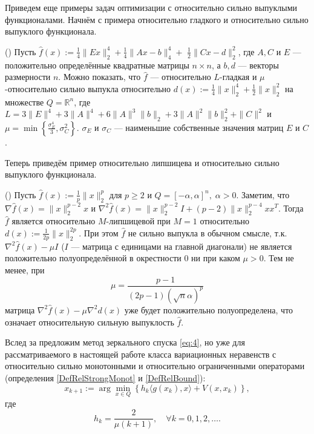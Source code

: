     Приведем еще примеры задач оптимизации с относительно сильно выпуклыми функционалами. Начнём с примера относительно гладкого и относительно сильно выпуклого функционала.

    \begin{example} (\cite{Lu_Nesterov_2018}) Пусть $\widehat{f}(x):=\frac{1}{4}\|E x\|_{2}^{4}+\frac{1}{4}\|A x-b\|_{4}^{4}+$ $\frac{1}{2}\|C x-d\|_{2}^{2}$, где $A, C$ и $E$ --- положительно определённые квадратные матрицы $n \times n$, а $b, d$ --- векторы размерности $n$. Можно показать, что $\widehat{f}$ --- относительно $L$-гладкая и $\mu$-относительно сильно выпукла относительно
        $
            d(x):=\frac{1}{4}\|x\|_{2}^{4}+\frac{1}{2}\|x\|_{2}^{2}
        $
        на множестве $Q=\mathbb{R}^{n}$, где $L=3\|E\|^{4}+3\|A\|^{4}+6\|A\|^{3}\|b\|_{2}+3\|A\|^{2}\|b\|_{2}^{2}+\|C\|^{2}$ и $\mu=\min \left\{\frac{\sigma_{E}^{4}}{3}, \sigma_{C}^{2}\right\}$. 
         $\sigma_{E}$ и $\sigma_{C}$ --- наименьшие собственные значения матриц $E$ и $C$.
    \end{example}

    Теперь приведём пример относительно липшицева и относительно сильно выпуклого функционала.

    \begin{example} (\cite{Zhou_NIPS_2020}) 
        Пусть $\widehat{f}(x) := \frac{1}{p} \|x\|_2^p$ для $p \geq 2$ и $ Q = [-\alpha, \alpha]^n, \; \alpha > 0$. Заметим, что $\nabla \widehat{f}(x) = \|x\|_2^{p - 2} x$ и $\nabla^2 \widehat{f}(x) = \|x\|_2^{p - 2} I + (p-2)\|x\|_2^{p - 4} x x^{T}$. Тогда $\widehat{f}$ является относительно $M$-липшицевой при $M = 1$ относительно $d(x) := \frac{1}{2p}\|x\|_2^{2p}$. При этом $\widehat{f}$ не сильно выпукла в обычном смысле, т.к. $\nabla^2 \widehat{f}(x) - \mu I$ ($I$ --- матрица с единицами на главной диагонали) не является положительно полуопределённой в окрестности 0 ни при каком $\mu >0$. Тем не менее, при 
        \begin{equation}\label{eq_mu}
            \mu = \frac{p-1}{(2p - 1)(\sqrt{n}\alpha)^p}  
        \end{equation}
        матрица $\nabla^2 \widehat{f}(x) - \mu \nabla^2 d(x)$ уже будет  положительно полуопределена, что означает относительную сильную выпуклость $\widehat{f}$.
        \label{ex_experiments}
    \end{example}



    Вслед за \cite{Bach_2012} предложим метод зеркального спуска \eqref{eq:4}, но уже для рассматриваемого в настоящей работе класса  вариационных неравенств с относительно сильно монотонными и относительно ограниченными операторами (определения \ref{DefRelStrongMonot} и \ref{DefRelBound}):
    \begin{equation} \label{eq:4}
        x_{k+1} := \arg \min_{x \in Q} \left\{ h_k \langle g(x_k), x \rangle + V(x, x_k)\right\},
    \end{equation}
    где
    $$
        h_k = \frac{2}{\mu(k+1)},\quad  \forall k= 0,1, 2, \ldots.
    $$


